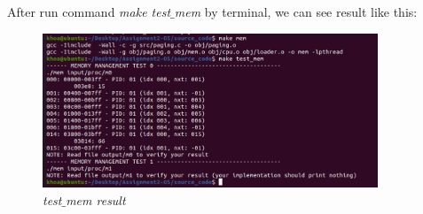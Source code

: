 \documentclass[13pt,a4paper]{article}
\begin{document}
			\newpage
			After run command \textit{make test$\_$mem} by terminal, we can see result like this:
			\begin{figure}[h!]
				\begin{center}
					\includegraphics[width=10cm]{testmem.png}
					\caption{\textit{test$\_$mem result}}
				\end{center}
			\end{figure}
\end{document}
